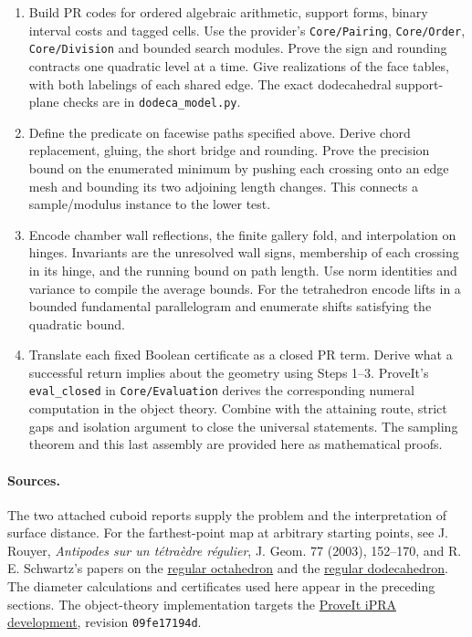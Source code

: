 \begin{enumerate}
\item Build PR codes for ordered algebraic arithmetic, support forms, binary interval costs and tagged cells. Use the provider's \texttt{Core/Pairing}, \texttt{Core/Order}, \texttt{Core/Division} and bounded search modules. Prove the sign and rounding contracts one quadratic level at a time. Give realizations of the face tables, with both labelings of each shared edge. The exact dodecahedral support-plane checks are in \texttt{dodeca\_model.py}.
\item Define the predicate on facewise paths specified above. Derive chord replacement, gluing, the short bridge and rounding. Prove the precision bound on the enumerated minimum by pushing each crossing onto an edge mesh and bounding its two adjoining length changes. This connects a sample/modulus instance to the lower test.
\item Encode chamber wall reflections, the finite gallery fold, and interpolation on hinges. Invariants are the unresolved wall signs, membership of each crossing in its hinge, and the running bound on path length. Use norm identities and variance to compile the average bounds. For the tetrahedron encode lifts in a bounded fundamental parallelogram and enumerate shifts satisfying the quadratic bound.
\item Translate each fixed Boolean certificate as a closed PR term. Derive what a successful return implies about the geometry using Steps 1--3. ProveIt's \texttt{eval\_closed} in \texttt{Core/Evaluation} derives the corresponding numeral computation in the object theory. Combine with the attaining route, strict gaps and isolation argument to close the universal statements. The sampling theorem and this last assembly are provided here as mathematical proofs.
\end{enumerate}
\paragraph{Sources.}
The two attached cuboid reports supply the problem and the interpretation of surface distance. For the farthest-point map at arbitrary starting points, see J. Rouyer, \emph{Antipodes sur un t\'etraèdre r\'egulier}, J. Geom. 77 (2003), 152--170, and R. E. Schwartz's papers on the \href{https://arxiv.org/abs/2004.11852}{regular octahedron} and the \href{https://arxiv.org/abs/2104.02567}{regular dodecahedron}. The diameter calculations and certificates used here appear in the preceding sections. The object-theory implementation targets the \href{https://github.com/VladimirReshetnikov/ProveIt/tree/09fe17194da14cdd100947737952e44100bb71b8/Logic/PrimitiveRecursiveArithmetic}{ProveIt iPRA development}, revision \texttt{09fe17194d}.
